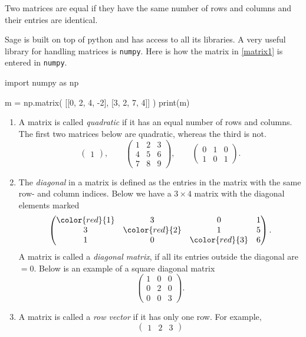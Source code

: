 \documentclass{article}
\begin{document}
Two matrices are equal if they have the same number of rows and columns and their entries are
identical.
 
Sage is built on top of python and has access to all its libraries. A
very useful library for handling matrices is \texttt{numpy}. Here is how
the matrix in \eqref{matrix1} is entered in \texttt{numpy}.

\begin{sage}
import numpy as np
  
m = np.matrix( [[0, 2, 4, -2], [3, 2, 7, 4]] )
print(m)
\end{sage}


\begin{enumerate}
\item
  A matrix is called  \emph{quadratic} if it has an equal number of rows and columns.
  The first two matrices below are quadratic, whereas the third is not.
$$
\begin{pmatrix} 1 \end{pmatrix}, \qquad
\begin{pmatrix} 1 & 2 & 3\\ 4 & 5 & 6\\ 7 & 8 & 9\end{pmatrix}, \qquad
\begin{pmatrix} 0 & 1 & 0\\ 1 & 0 & 1\end{pmatrix}.
$$
\item 
\label{diagonalmat}
The \emph{diagonal} in a matrix is defined as the entries in the matrix with the same row- and column indices.
Below we have a $3\times 4$ matrix with the diagonal elements marked
$$
\begin{pmatrix}
\color{red}{1} & 3 & 0 & 1\\
3 & \color{red}{2} & 1 & 5\\
1 & 0 & \color{red}{3} & 6
\end{pmatrix}.
$$
A matrix is called a \emph{diagonal matrix}, if all its entries outside the
diagonal are $=0$. Below is an example of a square diagonal matrix
$$
\begin{pmatrix}
1 & 0 & 0\\
0 & 2 & 0\\
0 & 0 & 3
\end{pmatrix}.
$$
\item
A matrix is called a \emph{row vector} if it has only one row. For example,
$$
\begin{pmatrix}
1 & 2 & 3

\end{pmatrix}$$
\end{enumerate}
\end{document}
